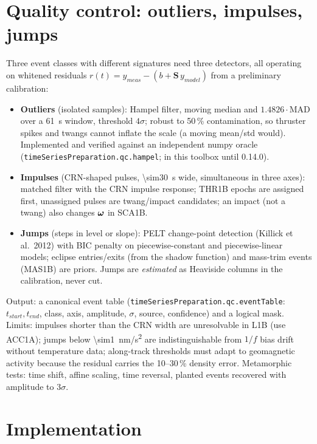 \section{Quality control: outliers, impulses, jumps}\label{sec:qc}
Three event classes with different signatures need three detectors, all operating on whitened residuals $r(t)=y_{meas}-(b+\mathbf S\,y_{model})$ from a preliminary calibration:
\begin{itemize}[nosep]
\item \textbf{Outliers} (isolated samples): Hampel filter, moving median and $1.4826\cdot$MAD over a \SI{61}{\second} window, threshold $4\sigma$; robust to 50\,\% contamination, so thruster spikes and twangs cannot inflate the scale (a moving mean/std would). Implemented and verified against an independent numpy oracle (\texttt{timeSeriesPreparation.qc.hampel}; in this toolbox until 0.14.0).
\item \textbf{Impulses} (CRN-shaped pulses, \SI{\sim30}{\second} wide, simultaneous in three axes): matched filter with the CRN impulse response; THR1B epochs are assigned first, unassigned pulses are twang/impact candidates; an impact (not a twang) also changes $\bm{\omega}$ in SCA1B.
\item \textbf{Jumps} (steps in level or slope): PELT change-point detection (Killick et al.\ 2012) with BIC penalty on piecewise-constant and piecewise-linear models; eclipse entries/exits (from the shadow function) and mass-trim events (MAS1B) are priors. Jumps are \emph{estimated} as Heaviside columns in the calibration, never cut.
\end{itemize}
Output: a canonical event table (\texttt{timeSeriesPreparation.qc.eventTable}: $t_{start},t_{end}$, class, axis, amplitude, $\sigma$, source, confidence) and a logical mask. Limits: impulses shorter than the CRN width are unresolvable in L1B (use ACC1A); jumps below \SI{\sim1}{nm/s^2} are indistinguishable from $1/f$ bias drift without temperature data; along-track thresholds must adapt to geomagnetic activity because the residual carries the 10--30\,\% density error. Metamorphic tests: time shift, affine scaling, time reversal, planted events recovered with amplitude to $3\sigma$.

\section{Implementation}
